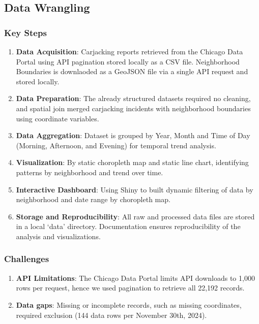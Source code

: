 \documentclass[
  9pt,
  letterpaper,
  DIV=11,
  numbers=noendperiod]{scrartcl}
\providecommand{\tightlist}{%
  \setlength{\itemsep}{0pt}\setlength{\parskip}{0pt}}\usepackage{longtable,booktabs,array}
\begin{document}
\subsection{Data Wrangling}\label{data-wrangling}

\subsubsection{Key Steps}\label{key-steps}

\begin{enumerate}
\def\labelenumi{\arabic{enumi}.}
\tightlist
\item
  \textbf{Data Acquisition}: Carjacking reports retrieved from the
  Chicago Data Portal using API pagination stored locally as a CSV file.
  Neighborhood Boundaries is downlaoded as a GeoJSON file via a single
  API request and stored locally.
\item
  \textbf{Data Preparation}: The already structured datasets required no
  cleaning, and spatial join merged carjacking incidents with
  neighborhood boundaries using coordinate variables.
\item
  \textbf{Data Aggregation}: Dataset is grouped by Year, Month and Time
  of Day (Morning, Afternoon, and Evening) for temporal trend analysis.
\item
  \textbf{Visualization}: By static choropleth map and static line
  chart, identifying patterns by neighborhood and trend over time.
\item
  \textbf{Interactive Dashboard}: Using Shiny to built dynamic filtering
  of data by neighborhood and date range by choropleth map.
\item
  \textbf{Storage and Reproducibility}: All raw and processed data files
  are stored in a local `data' directory. Documentation ensures
  reproducibility of the analysis and visualizations.
\end{enumerate}

\subsubsection{Challenges}\label{challenges}

\begin{enumerate}
\def\labelenumi{\arabic{enumi}.}
\tightlist
\item
  \textbf{API Limitations}: The Chicago Data Portal limits API downloads
  to 1,000 rows per request, hence we used pagination to retrieve all
  22,192 records.
\item
  \textbf{Data gaps}: Missing or incomplete records, such as missing
  coordinates, required exclusion (144 data rows per November 30th,
  2024).
\end{enumerate}
\end{document}
